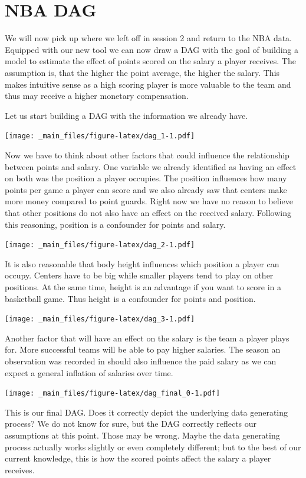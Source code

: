 \documentclass[
]{book}
\begin{document}
\hypertarget{nba-dag}{%
\section{NBA DAG}\label{nba-dag}}

We will now pick up where we left off in session 2 and return to the NBA data.
Equipped with our new tool we can now draw a DAG with the goal of building a
model to estimate the effect of points scored on the salary a player receives.
The assumption is, that the higher the point average, the higher the salary.
This makes intuitive sense as a high scoring player is more valuable to the team
and thus may receive a higher monetary compensation.

Let us start building a DAG with the information we already have.

\texttt{[image: \_main\_files/figure-latex/dag\_1-1.pdf]}

Now we have to think about other factors that could influence the relationship
between points and salary. One variable we already identified as having an
effect on both was the position a player occupies. The position influences how
many points per game a player can score and we also already saw that centers
make more money compared to point guards. Right now we have no reason to believe
that other positions do not also have an effect on the received salary.
Following this reasoning, position is a confounder for points and salary.

\texttt{[image: \_main\_files/figure-latex/dag\_2-1.pdf]}

It is also reasonable that body height influences which position a
player can occupy. Centers have to be big while smaller players tend to play on
other positions. At the same time, height is an advantage if you want to score
in a basketball game. Thus height is a confounder for points and position.

\texttt{[image: \_main\_files/figure-latex/dag\_3-1.pdf]}

Another factor that will have an effect on the salary is the team a player plays
for. More successful teams will be able to pay higher salaries. The season an
observation was recorded in should also influence the paid salary as we can
expect a general inflation of salaries over time.

\texttt{[image: \_main\_files/figure-latex/dag\_final\_0-1.pdf]}

This is our final DAG. Does it correctly depict the underlying data generating
process? We do not know for sure, but the DAG correctly reflects our assumptions
at this point. Those may be wrong. Maybe the data generating process actually
works slightly or even completely different; but to the best of our current
knowledge, this is how the scored points affect the salary a player receives.
\end{document}
